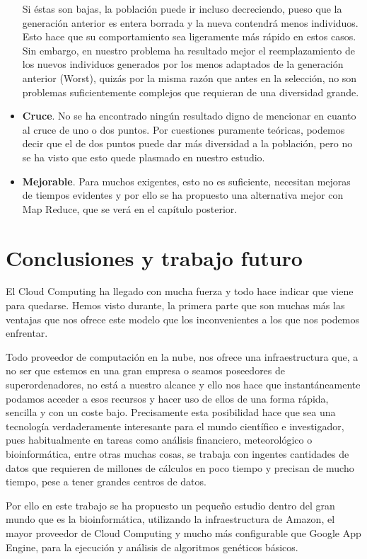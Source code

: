 \documentclass[runningheads]{llncs}
\begin{document}
\begin{itemize}
 Si éstas son bajas, la población puede ir incluso decreciendo, pueso que la generación anterior es entera borrada y 
 la nueva contendrá menos individuos. Esto hace que su comportamiento sea ligeramente más rápido en estos casos. Sin embargo, 
 en nuestro problema ha resultado mejor el reemplazamiento de los nuevos individuos generados por los menos adaptados de la 
 generación anterior (Worst), quizás por la misma razón que antes en la selección, no son problemas suficientemente complejos 
 que requieran de una diversidad grande.
 \item \textbf{Cruce}. No se ha encontrado ningún resultado digno de mencionar en cuanto al cruce de uno o dos puntos. Por cuestiones 
 puramente teóricas, podemos decir que el de dos puntos puede dar más diversidad a la población, pero no se ha visto que esto 
 quede plasmado en nuestro estudio.
 \item \textbf{Mejorable}. Para muchos exigentes, esto no es suficiente, necesitan mejoras de tiempos evidentes y por ello se 
 ha propuesto una alternativa mejor con Map Reduce, que se verá en el capítulo posterior.
\end{itemize}

\section{Conclusiones y trabajo futuro}
\label{sec:conc}




El Cloud Computing ha llegado con mucha fuerza y todo hace indicar que viene para quedarse.  Hemos visto durante, 
la primera parte que son muchas más las ventajas que nos ofrece este modelo que los inconvenientes a los que nos podemos 
enfrentar.  

Todo proveedor de computación en la nube, nos ofrece una infraestructura que, a no ser que estemos en una gran empresa o 
seamos poseedores de superordenadores, no está a nuestro alcance y ello nos hace que instantáneamente podamos acceder 
a esos recursos y hacer uso de ellos de una forma rápida, sencilla y con un coste bajo.  Precisamente esta posibilidad hace que 
sea una tecnología verdaderamente interesante para el mundo científico e investigador, pues habitualmente en tareas como 
análisis financiero, meteorológico o bioinformática, entre otras muchas cosas, se trabaja con ingentes cantidades de datos 
que requieren de millones de cálculos en poco tiempo y precisan de mucho tiempo, pese a tener grandes centros de datos. 

Por ello en este trabajo se ha propuesto un pequeño estudio dentro del gran mundo que es la bioinformática, utilizando 
la infraestructura de Amazon, el mayor proveedor de Cloud Computing y mucho más configurable que Google App Engine,
para la ejecución y análisis de algoritmos genéticos básicos.  
\end{document}
